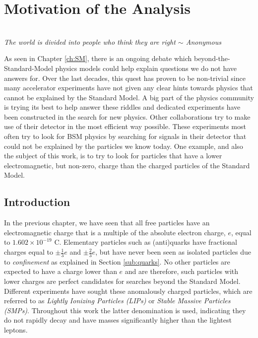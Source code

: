 \chapter{Motivation of the Analysis}
\label{ch:theoreticalmotivation}
\begin{flushright}
\textit{\\The world is divided into people who think they are right $\sim$ Anonymous\\}
\end{flushright}

\noindent As seen in Chapter \ref{ch:SM}, there is an ongoing debate which beyond-the-Standard-Model physics models could help explain questions we do not have answers for. Over the last decades, this quest has proven to be non-trivial since many accelerator experiments have not given any clear hints towards physics that cannot be explained by the Standard Model. A big part of the physics community is trying its best to help answer these riddles and dedicated experiments have been constructed in the search for new physics. Other collaborations try to make use of their detector in the most efficient way possible. These experiments most often try to look for BSM physics by searching for signals in their detector that could not be explained by the particles we know today. One example, and also the subject of this work, is to try to look for particles that have a lower electromagnetic, but non-zero, charge than the charged particles of the Standard Model.

\section{Introduction}
In the previous chapter, we have seen that all free particles have an electromagnetic charge that is a multiple of the absolute electron charge, $e$, equal to $1.602 \times 10^{-19}$ C. Elementary particles such as (anti)quarks have fractional charges equal to $\pm\frac{1}{3}e$ and $\pm\frac{2}{3}e$, but have never been seen as isolated particles due to \textit{confinement} as explained in Section \ref{sub:quarks}. No other particles are expected to have a charge lower than $e$ and are therefore, such particles with lower charges are perfect candidates for searches beyond the Standard Model. Different experiments have sought these anomalously charged particles, which are referred to as \textit{Lightly Ionizing Particles (LIPs)} or \textit{Stable Massive Particles (SMPs)}. Throughout this work the latter denomination is used, indicating they do not rapidly decay and have masses significantly higher than the lightest leptons.

